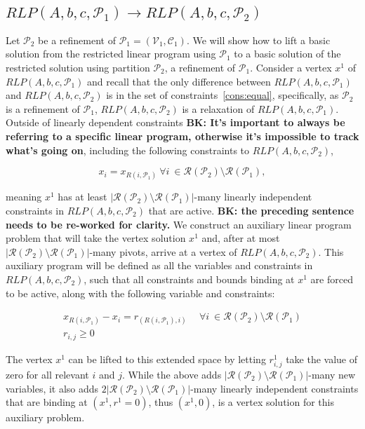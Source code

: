 \documentclass[runningheads]{llncs}
\newcommand{\cP}{{\mathcal P}}
\newcommand{\cC}{{\mathcal C}}
\newcommand{\cV}{{\mathcal V}}
\newcommand{\cR}{{\mathcal R}}
\begin{document}
\subsection{$RLP(A,b,c,\cP_1) \rightarrow RLP(A,b,c,\cP_2)$}


Let $\cP_2$ be a refinement of $\cP_1 = (\cV_1, \cC_1)$. We will show how to lift a basic solution from the restricted linear program using $\cP_1$ to a basic solution of the restricted solution using partition $\cP_2$, a refinement of $\cP_1$. Consider a vertex $x^1$ of $RLP(A,b,c,\cP_1)$ and recall that the only difference between $RLP(A,b,c,\cP_1)$ and $RLP(A,b,c,\cP_2)$ is in the set of constraints~\eqref{cons:equal}, specifically, as $\cP_2$ is a refinement of $\cP_1$, $RLP(A,b,c,\cP_2)$ is a relaxation of $RLP(A,b,c,\cP_1)$. Outside of linearly dependent constraints {\bf BK: It's important to always be referring to a specific linear program, otherwise it's impossible to track what's going on}, including the following constraints to $RLP(A,b,c,\cP_2)$,

$$ x_i = x_{R(i,\cP_1)} \ \forall i\ \in \cR(\cP_2) \setminus \cR(\cP_1),$$

\noindent meaning $x^1$ has at least $|\cR(\cP_2) \setminus \cR(\cP_1)|$-many linearly independent constraints in $RLP(A,b,c,\cP_2)$ that are active. {\bf BK: the preceding sentence needs to be re-worked for clarity.} We construct an auxiliary linear program problem that will take the vertex solution $x^1$ and, after at most $|\cR(\cP_2) \setminus \cR(\cP_1)|$-many pivots, arrive at a vertex of  $RLP(A,b,c,\cP_2)$. This auxiliary program will be defined as all the variables and constraints in $RLP(A,b,c,\cP_2)$, such that all constraints and bounds binding at $x^1$ are forced to be active, along with the following variable and constraints:

\begin{align}
x_{R(i,\cP_1)}  - x_i = r_{(R(i,\cP_1), i) } &\ \  \forall i\ \in \cR(\cP_2) \setminus \cR(\cP_1) \label{eq:linking}\\
r_{i,j} \geq 0 \label{eq:bound}
\end{align}

\noindent The vertex $x^1$ can be lifted to this extended space by letting $r_{i,j}^1$ take the value of zero for all relevant $i$ and $j$. While the above adds $|\cR(\cP_2) \setminus \cR(\cP_1)|$-many new variables, it also adds $2|\cR(\cP_2) \setminus \cR(\cP_1)|$-many linearly independent constraints that are binding at $(x^1,r^1=0)$, thus $(x^1,0)$, is a vertex solution for this auxiliary problem.  
\end{document}
